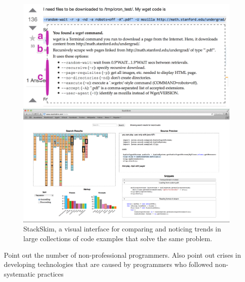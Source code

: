 \documentclass[12pt]{memoir}
\begin{document}
\begin{figure}%
  \centering
  \parbox{.45\textwidth}{%
    \includegraphics[width=\linewidth]{figures/tutorons_microexplanation}
    \caption{%
      A micro-explanation for a command line generated by a Tutoron with multiple levels of detail 
      (definition, high-level intent, arguments)
    }\label{fig:tutorons_microexplanation}
  }%
  \qquad
  \parbox{.45\textwidth}{%
    \includegraphics[width=\linewidth]{figures/stackskim_ui}
    \caption{%
      StackSkim, a visual interface for comparing and noticing trends in large collections of code examples that solve the same problem.
    }\label{fig:stackskim_ui}
  }
\end{figure}

Point out the number of non-professional programmers.
Also point out crises in developing technologies that are caused by programmers who followed non-systematic practices
\end{document}
